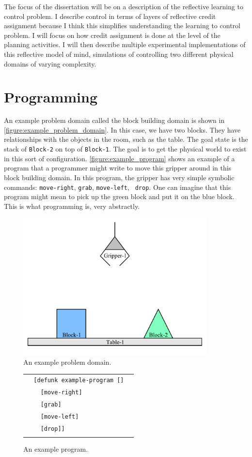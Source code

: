 The focus of the dissertation will be on a description of the
reflective learning to control problem.  I describe control in terms
of layers of reflective credit assignment because I think this
simplifies understanding the learning to control problem.  I will
focus on how credit assignment is done at the level of the planning
activities.  I will then describe multiple experimental
implementations of this reflective model of mind, simulations of
controlling two different physical domains of varying complexity.

\section{Programming}

An example problem domain called the block building domain is shown in
\autoref{figure:example_problem_domain}.  In this case, we have two
blocks.  They have relationships with the objects in the room, such as
the table.  The goal state is the stack of {\tt Block-2} on top of
{\tt Block-1}.  The goal is to get the physical world to exist in this
sort of configuration.
\autoref{figure:example_program} shows an example of a program that a
programmer might write to move this gripper around in this block
building domain.  In this program, the gripper has very simple
symbolic commands: {\tt move-right}, {\tt grab}, {\tt move-left}, {\tt
  drop}.  One can imagine that this program might mean to pick up the
green block and put it on the blue block.  This is what programming
is, very abstractly.
\begin{figure}
\center
\includegraphics[width=10cm]{gfx/blocks_world_example-1}
\caption{An example problem domain.}
\label{figure:example_problem_domain}
\end{figure}
\begin{figure}
\center
\begin{tabular}{l}
\\
  {\tt ~~[defunk example-program []}~~ \\
  {\tt ~~~~[move-right]} ~~\\
  {\tt ~~~~[grab]} ~~\\
  {\tt ~~~~[move-left]} ~~\\
  {\tt ~~~~[drop]]} ~~\\
\\
\end{tabular}
\caption{An example program.}
\label{figure:example_program}
\end{figure}

